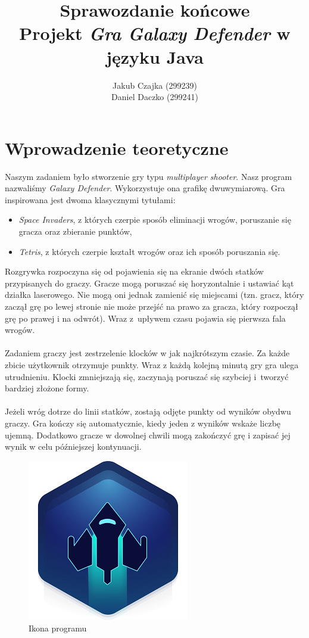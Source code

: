 \documentclass[a4paper]{article}
\title{Sprawozdanie końcowe \\ Projekt \textit{Gra Galaxy Defender} w języku Java}
\author{Jakub Czajka (299239) \\ Daniel Daczko (299241)}
\begin{document}
\maketitle
\tableofcontents
\thispagestyle{empty}
\newpage

\section{Wprowadzenie teoretyczne}
Naszym zadaniem było stworzenie gry typu \textit{multiplayer shooter}. Nasz program nazwaliśmy \textit{Galaxy Defender}. Wykorzystuje ona grafikę dwuwymiarową. Gra inspirowana jest dwoma klasycznymi tytułami:
\begin{itemize}
    \item \textit{Space Invaders}, z których czerpie sposób eliminacji wrogów, poruszanie się gracza oraz zbieranie punktów,
    \item \textit{Tetris}, z których czerpie kształt wrogów oraz ich sposób poruszania się.
\end{itemize}
Rozgrywka rozpoczyna się od pojawienia się na ekranie dwóch statków przypisanych do graczy. Gracze mogą poruszać się horyzontalnie i ustawiać kąt działka laserowego.
Nie mogą oni jednak zamienić się miejscami (tzn. gracz, który zaczął grę po lewej stronie nie może przejść na prawo za gracza, który rozpoczął grę po prawej i na odwrót).
Wraz z~upływem czasu pojawia się pierwsza fala wrogów.\\ \\
Zadaniem graczy jest zestrzelenie klocków w jak najkrótszym czasie. Za każde zbicie użytkownik otrzymuje punkty.
Wraz z każdą kolejną minutą gry gra ulega utrudnieniu. Klocki zmniejszają się, zaczynają poruszać się szybciej i~tworzyć bardziej złożone formy.\\ \\
Jeżeli wróg dotrze do linii statków, zostają odjęte punkty od wyników obydwu graczy. Gra kończy się automatycznie, kiedy jeden z wyników wskaże liczbę ujemną. 
Dodatkowo gracze w dowolnej chwili mogą zakończyć grę i zapisać jej wynik w celu późniejszej kontynuacji.
\\
\begin{figure}[H]
    \centering
    \includegraphics[]{img/ikona.png}
    \caption{Ikona programu}
    \label{fig:ikona}
\end{figure}
\end{document}
